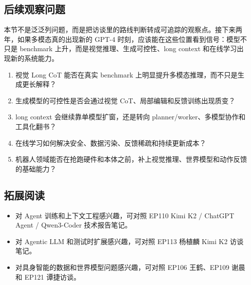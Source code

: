 \subsection{后续观察问题}

本节不是泛泛列问题，而是把访谈里的路线判断转成可追踪的观察点。接下来两年，如果多模态真的出现新的 GPT-4 时刻，应该能在这些位置看到信号：模型不只是 benchmark 上升，而是视觉推理、生成可控性、long context 和在线学习出现新的系统能力。

\begin{enumerate}
\item 视觉 Long CoT 能否在真实 benchmark 上明显提升多模态推理，而不只是生成更长解释？
\item 生成模型的可控性是否会通过视觉 CoT、局部编辑和反馈训练出现质变？
\item long context 会继续靠单模型扩窗，还是转向 planner/worker、多模型协作和工具化翻书？
\item 在线学习如何解决安全、数据污染、反馈稀疏和持续更新成本？
\item 机器人领域能否在抢跑硬件和本体之前，补上视觉推理、世界模型和动作反馈的基础能力？
\end{enumerate}

\subsection{拓展阅读}

\begin{itemize}
\item 对 Agent 训练和上下文工程感兴趣，可对照 EP110 Kimi K2 / ChatGPT Agent / Qwen3-Coder 技术报告笔记。
\item 对 Agentic LLM 和测试时扩展感兴趣，可对照 EP113 杨植麟 Kimi K2 访谈笔记。
\item 对具身智能的数据和世界模型问题感兴趣，可对照 EP106 王鹤、EP109 谢晨和 EP121 谭捷访谈。
\end{itemize}


